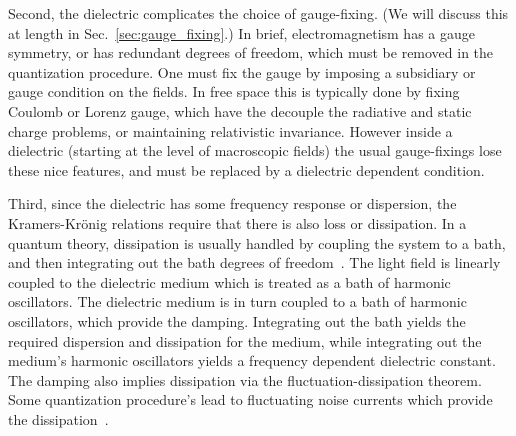 Second, the dielectric complicates the choice of gauge-fixing.  (We will discuss this at length in Sec.~\ref{sec:gauge_fixing}.)
In brief, electromagnetism has a gauge symmetry, or has redundant degrees of freedom, which must be 
removed in the quantization procedure.  One must fix the gauge by imposing a subsidiary or gauge condition
on the fields.  In free space this is typically done by fixing Coulomb or Lorenz gauge, which have the 
decouple the radiative and static charge problems, or maintaining relativistic invariance.
However inside a dielectric (starting at the level of macroscopic fields) the usual gauge-fixings lose these nice
features, and must be replaced by a dielectric dependent condition.  

Third, since the dielectric has some frequency response or dispersion, the Kramers-Kr\"onig relations 
require that there is also loss or dissipation.
In a quantum theory, dissipation is usually handled by coupling the system to a bath, and then
integrating out the bath degrees of freedom~\cite{Huttner1992,Dung1998,Bechler1999}. 
The light field is linearly coupled to the dielectric medium which is treated
as a bath of harmonic oscillators.
The dielectric medium is in turn coupled to a bath of harmonic oscillators, which provide the damping.
Integrating out the bath yields the required dispersion and dissipation for the medium, 
while integrating out the medium's harmonic oscillators yields a frequency dependent dielectric constant.
The damping also implies dissipation via the fluctuation-dissipation theorem.  
Some quantization procedure's lead to fluctuating noise currents which provide the dissipation~\cite{Dung1998}.



